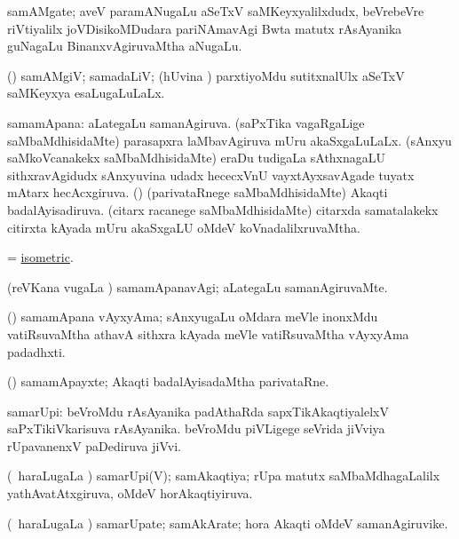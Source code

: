 \bentry
{}
\gl{\nA}
\bmng
samAMgate; aveV paramANugaLu aSeTxV saMKeyxyalilxdudx, beVrebeVre riVtiyalilx joVDisikoMDudara pariNAmavAgi Bwta matutx rAsAyanika guNagaLu BinanxvAgiruvaMtha aNugaLu. 
\emng
\eentry

\bentry
{}
\gl{\gu}
\bmng
(\savi) samAMgiV; samadaLiV; (hUvina \vi) parxtiyoMdu sutitxnalUlx aSeTxV saMKeyxya esaLugaLuLaLx. 
\emng
\eentry

\bentry
{}
\gl{\gu}
\bmng
samamApana: 
\banum
{} aLategaLu samanAgiruva. 
 (saPxTika vagaRgaLige saMbaMdhisidaMte) parasapxra laMbavAgiruva mUru akaSxgaLuLaLx. 
 (sAnxyu saMkoVcanakekx saMbaMdhisidaMte) eraDu tudigaLa sAthxnagaLU sithxravAgidudx sAnxyuvina udadx hececxVnU vayxtAyxsavAgade tuyatx mAtarx hecAcxgiruva. 
 (\ga) (parivataRnege saMbaMdhisidaMte) Akaqti badalAyisadiruva. 
 (citarx racanege saMbaMdhisidaMte) citarxda samatalakekx citirxta kAyada mUru akaSxgaLU oMdeV koVnadalilxruvaMtha. 
\eanum
\emng
\eentry

\bentry
{}
\gl{\gu}
\bmng
=  \hyperlink{isometric}{isometric}. 
\emng
\eentry

\bentry
{}
\gl{\kirxvi}
\bmng
(reVKana \mo vugaLa \vi) samamApanavAgi; aLategaLu samanAgiruvaMte. 
\emng
\eentry

\bentry
{}
\gl{\nA}
\bmng
(\bava) samamApana vAyxyAma; sAnxyugaLu oMdara meVle inonxMdu vatiRsuvaMtha athavA sithxra kAyada meVle vatiRsuvaMtha vAyxyAma padadhxti. 
\emng
\eentry

\bentry
{}
\gl{\nA}
\bmng
(\ga) samamApayxte; Akaqti badalAyisadaMtha parivataRne. 
\emng
\eentry

\bentry
{}
\gl{\nA}
\bmng
samarUpi: 
\banum
{} beVroMdu rAsAyanika padAthaRda sapxTikAkaqtiyalelxV saPxTikiVkarisuva rAsAyanika. 
 beVroMdu piVLigege seVrida jiVviya rUpavanenxV paDediruva jiVvi. 
\eanum
\emng
\eentry

\bentry
{}
\gl{\gu}
\bmng
(\kanmu\ haraLugaLa \vi) samarUpi(V); samAkaqtiya; rUpa matutx saMbaMdhagaLalilx yathAvatAtxgiruva, oMdeV horAkaqtiyiruva. 
\emng
\eentry

\bentry
{}
\gl{\nA}
\bmng
(\kanmu\ haraLugaLa \vi) samarUpate; samAkArate; hora Akaqti oMdeV samanAgiruvike. 
\emng
\eentry

